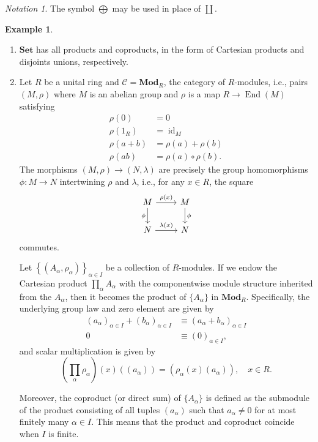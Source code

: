 \documentclass[10pt,letterpaper,cm]{nupset}
\theoremstyle{definition}
\newtheorem{exmp}[definition]{Example}
\theoremstyle{theorem}
\theoremstyle{remark}
\newtheorem*{notation}{Notation}
\newcommand{\1}{\mathbf{1}}
\renewcommand{\c}{\mathscr{C}}
\newcommand{\0}{\vec 0}
\DeclareMathOperator{\id}{\mathrm{id}}
\DeclareMathOperator{\ed}{End}
\begin{document}
 \begin{notation}
 The symbol $\bigoplus$ may be used in place of $\coprod$.
 \end{notation}


\begin{exmp} $ $
\begin{enumerate}
\item $\mathbf{Set}$ has all products and coproducts, in the form of Cartesian products and disjoints unions, respectively.
\item Let $R$ be a unital ring and $\c = \mathbf{Mod}_R$, the category of $R$-modules, i.e., pairs $(M, \rho)$ where $M$ is an abelian group and $\rho$ is a map $R \to \ed(M)$ satisfying 
\begin{align*}  \rho(0) &= 0  \\  \rho(1_R) &= \id_M \\   \rho(a +b) &= \rho(a) + \rho(b)  \\  \rho(ab) &= \rho(a) \circ \rho(b). \end{align*} The morphisms $(M, \rho) \to (N, \lambda)$ are precisely the group homomorphisms $\phi : M \to N$ intertwining $\rho$ and $\lambda$, i.e., for any $x \in R$, the square
\[
\begin{tikzcd}
M \arrow[d, "\phi"'] \arrow[r, "\rho(x)"] & M \arrow[d, "\phi"] \\
N \arrow[r, "\lambda(x)"] & N
\end{tikzcd}
\] commutes.

Let $\left\{\left(A_{\alpha}, \rho_{\alpha}\right)\right\}_{\alpha \in I}$ be a collection of $R$-modules. If we endow the Cartesian product $\prod_{\alpha} A_{\alpha}$ with the componentwise module structure inherited from the $A_{\alpha}$, then it becomes the product of $\{A_{\alpha}\}$ in $\mathbf{Mod}_R$. Specifically, the underlying group law and zero element are given by 
\begin{align*}
\left(a_{\alpha}\right)_{\alpha \in I} + \left(b_{\alpha}\right)_{\alpha \in I} & \equiv \left(a_{\alpha} + b_{\alpha}\right)_{\alpha \in I}
\\  0&  \equiv \left(0\right)_{\alpha \in I}
,\end{align*} and scalar multiplication is given by
\[
\left(\prod_{\alpha} \rho_{\alpha}\right)(x)\left(\left(a_{\alpha}\right)\right)=\left(\rho_{\alpha}(x)\left(a_{\alpha}\right)\right), \quad x\in R
.\] 

Moreover, the coproduct (or direct sum) of $\{A_{\alpha}\}$ is defined as the submodule of the product consisting of all tuples $(a_{\alpha})$ such that $a_{\alpha} \ne 0$ for at most finitely many $\alpha \in I$. This means that the product and coproduct coincide when $I$ is finite.


\end{enumerate}
\end{exmp}
\end{document}
